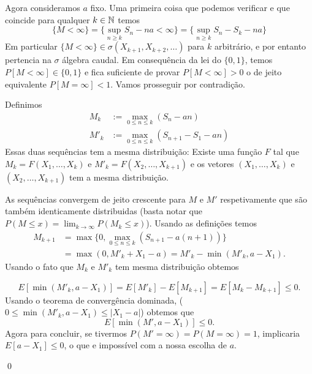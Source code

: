 \medskip

Agora consideramos $a$ fixo.
Uma primeira coisa que podemos verificar e que coincide para qualquer $k \in {\ensuremath{\mathbb N}}$ temos
\begin{equation}
  \{M<\infty\}=\{ \sup_{n\ge k} S_n-n a<\infty \}= \{\sup_{n\ge k} S_n-S_k-na \}
\end{equation}
Em particular $\{M<\infty\}\in \sigma(X_{k+1},X_{k+2},\dots )$ para $k$ arbitrário, e por entanto pertencia na $\sigma$ álgebra caudal.
Em consequência da lei do $\{0,1\}$, temos $P[M<\infty]\in \{0,1\}$ e fica suficiente de provar $P[M<\infty]>0$ o de jeito equivalente
$P[M=\infty]<1$. Vamos prosseguir por contradição.

\medskip

Definimos
\begin{equation*}
  \begin{split}
    M_k &:= \max_{0 \le n \le k} (S_n - an)\\
    M'_k &:= \max_{0 \le n \le k} (S_{n+1} - S_1 - an)
  \end{split}
\end{equation*}
Essas duas sequências tem a mesma distribuição: Existe uma função $F$ tal que $M_k = F(X_1, \dots, X_k)$ e $M'_k = F(X_2, \dots, X_{k+1})$ e os vetores $(X_1, \dots, X_k)$ e $(X_2, \dots, X_{k+1})$ tem a mesma distribuição.

\medskip

As sequências convergem de jeito crescente para $M$ e $M'$ respetivamente que são também identicamente distribuidas (basta notar que $P(M \le x) = \lim_{k \to \infty} P(M_k \le x)$).
Usando as definições temos
\begin{equation*}
  \begin{split}
    M_{k+1}
    & = \max \Big\{ 0, \max_{0 \leq n \leq k} (S_{n + 1} - a(n + 1)) \Big\}\\
    & = \max(0, M'_k + X_1 - a) = M'_k - \min(M'_k, a - X_1).
  \end{split}
\end{equation*}
Usando o fato que $M_k$ e $M'_k$ tem mesma distribuição obtemos

$$E[\min(M'_k,a-X_1)]=E[M'_{k}]-E[M_{k+1}]=E[M_{k}-M_{k+1}]\le 0.$$
Usando o teorema de convergência dominada, ($0\le \min(M'_k,a-X_1)\le |X_1-a|$) obtemos que
$$E[\min(M',a-X_1)]\le 0.$$
Agora para concluir, se tivermos $P(M'=\infty)=P(M=\infty)=1$, implicaria
$E[a-X_1]\le 0$,
o que e impossível com a nossa escolha de $a$.

\qed





